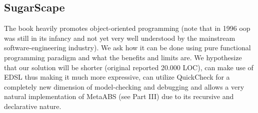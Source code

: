 \subsection{SugarScape}
The book heavily promotes object-oriented programming (note that in 1996 oop was still in its infancy and not yet very well understood by the mainstream software-engineering industry). We ask how it can be done using pure functional programming paradigm and what the benefits and limits are. We hypothesize that our solution will be shorter (original reported 20.000 LOC), can make use of EDSL thus making it much more expressive, can utilize QuickCheck for a completely new dimension of model-checking and debugging and allows a very natural implementation of MetaABS (see Part III) due to its recursive and declarative nature.
